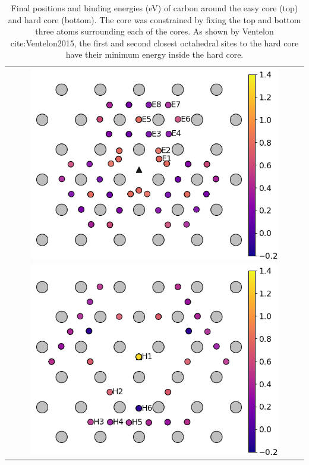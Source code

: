 \documentclass[a4paper]{article}
\begin{document}
\begin{table}	
    \begin{tabular}{c}
 	          \includegraphics[width=0.85\textwidth]{../Images/easy_core_fe_C_positioning_energies.png}  \\
 	          \includegraphics[width=0.85\textwidth]{../Images/hard_core_fe_C_positioning_energies.png}  \\

     	     \end{tabular}		
\caption{ Final positions and binding energies (eV) of carbon around the easy core (top) and hard core (bottom). The core was constrained by fixing the top and bottom three atoms surrounding each of the cores. As shown by Ventelon cite:Ventelon2015, the first and second closest octahedral sites to the hard core have their minimum energy inside the hard core. }
   \end{table}
\end{document}
